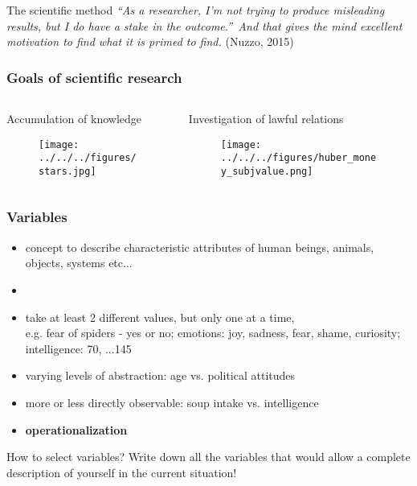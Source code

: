 \documentclass[]{beamer}
\begin{document}
\begin{frame}{The scientific method}
\textit{\textquotedblleft As a researcher, I'm not trying to produce misleading results, but I do have a stake in the outcome.\textquotedblright \ And that 
gives the mind excellent motivation to find what it is primed to find.} (Nuzzo, 2015)
\end{frame}


\begin{frame}
 \frametitle{Goals of scientific research}
\begin{columns}[T]
\begin{column}{60mm}
Accumulation of knowledge
\begin{figure}
\texttt{[image: ../../../figures/stars.jpg]} 
\end{figure}
\end{column}
\begin{column}{60mm}
Investigation of lawful relations
\begin{figure}
\texttt{[image: ../../../figures/huber\_money\_subjvalue.png]}
\end{figure}
\end{column}
\end{columns}
\end{frame}


\begin{frame}
\frametitle{Variables}
\begin{itemize}
 \item concept to describe characteristic attributes of human beings, animals, objects, systems etc...
 \item[]
 \item <2-> take at least 2 different values, but only one at a time, \\ 
e.g. fear of spiders - yes or no; emotions: joy, sadness, fear, shame, curiosity; intelligence: 70, ...145
 \item<2-> varying levels of abstraction: age vs. political attitudes
 \item<2-> more or less directly observable: soup intake vs. intelligence
 \item<2->[$\rightarrow$] \textbf{operationalization}
\end{itemize}
\end{frame}


\begin{frame}
 
\begin{exampleblock}{How to select variables?}
Write down all the variables that would allow a complete description of yourself in the current situation! 
\end{exampleblock}
\end{frame}
\end{document}
